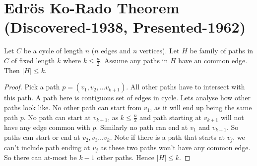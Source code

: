 \section{Edr{\"o}s Ko-Rado Theorem (Discovered-1938, Presented-1962)}
\begin{lemma} Let $C$ be a cycle of length $n$ ($n$ edges and $n$ vertices). Let $H$ be family of paths in $C$ of fixed length $k$ where $k\le \frac{n}{2}$. Assume any paths in $H$ have an common edge. Then $|H|\le k$.
\begin{proof}Pick a path $p = (v_1, v_2, \hdots v_{k+1})$. All other paths have to intersect with this path. A path here is contiguous set of edges in cycle. Lets analyse how other paths look like. No other path can start from $v_1$, as it will end up being the same path $p$. No path can start at $v_{k+1}$, as $k\le \frac{n}{2}$ and path starting at $v_{k+1}$ will not have any edge common with $p$. Similarly no path can end at $v_1$ and $v_{k+1}$. So paths can start or end at $v_2, v_3 \hdots v_{k}$. Note if there is a path that starts at $v_j$, we can't include path ending at $v_j$ as these two paths won't have any common edge. So there can at-most be $k-1$ other paths. Hence $|H|\le k$.
\end{proof}
\end{lemma}

